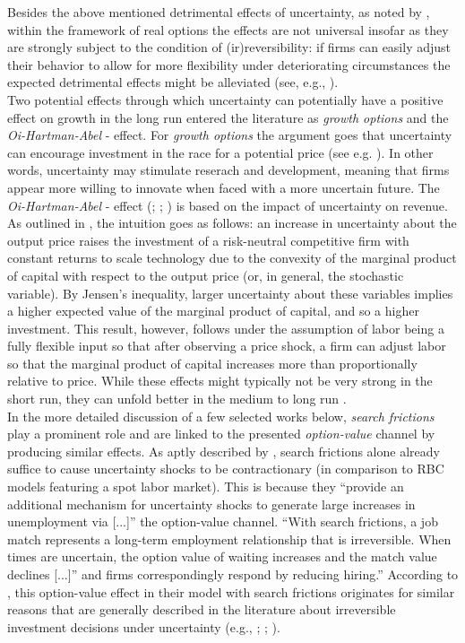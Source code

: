 \documentclass[a4paper,11pt,listof=nochaptergap,oneside,pointednumbers,bibtotoc,bigheadings,liststotoc,hidelinks]{scrbook}
\theoremstyle{mysatz}
\theoremstyle{mydefinition}
\theoremstyle{mytheorem}
\theoremstyle{mybemerkung}
\begin{document}
Besides the above mentioned detrimental effects of uncertainty, as noted by \citet{bloom:14}, within the framework of real options the effects are not universal insofar as they are strongly subject to the condition of (ir)reversibility: if firms can easily adjust their behavior to allow for more flexibility under deteriorating circumstances the expected detrimental effects might be alleviated (see, e.g., \citealp{vallettaandbengali:13}).\\

Two potential effects through which uncertainty can potentially have a positive effect on growth in the long run entered the literature as \textit{growth options} and the \textit{Oi-Hartman-Abel} - effect. For \textit{growth options} the argument goes that uncertainty can encourage investment in the race for a potential price (see e.g. \citealp{ilhanstrange:96}). In other words, uncertainty may stimulate reserach and development, meaning that firms appear more willing to innovate when faced with a more uncertain future. The \textit{Oi-Hartman-Abel} - effect (\citealp{oi:61}; \citealp{hartman:72}; \citealp{abel:83}) is based on the impact of uncertainty on revenue. As outlined in \citet{saltarietal:00}, the intuition goes as follows: an increase in uncertainty about the output price raises the investment of a risk-neutral competitive firm with constant returns to scale technology due to the convexity of the marginal product of capital with respect to the output price (or, in general, the stochastic variable). By Jensen’s inequality, larger uncertainty about these variables implies a higher expected value of the marginal product of capital, and so a higher investment. This result, however, follows under the assumption of labor being a fully flexible input so that after observing a price shock, a firm can adjust labor so that the marginal product of capital increases more than proportionally relative to price. While these effects might typically not be very strong in the short run, they can unfold better in the medium to long run \citep{bloom:14}.\\

In the more detailed discussion of a few selected works below, \textit{search frictions} play a prominent role and are linked to the presented \textit{option-value} channel by producing similar effects. As aptly described by \citet{leducandliu:16}, search frictions alone already suffice to cause uncertainty shocks to be contractionary (in comparison to RBC models featuring a spot labor market). This is because they ``provide an additional mechanism for uncertainty shocks to generate large increases in unemployment via [...]'' the option-value channel. ``With search frictions, a job match represents a long-term employment relationship that is irreversible. When times are uncertain, the option value of waiting increases and the match value declines [...]'' and firms correspondingly respond by reducing hiring.'' According to \citet{leducandliu:16}, this option-value effect in their model with search frictions originates for similar reasons that are generally described in the literature about irreversible investment decisions under uncertainty (e.g., \citealp{bernanke:83}; \citealp{bloom:09}; \citealp{bloometal:12}).
\end{document}

